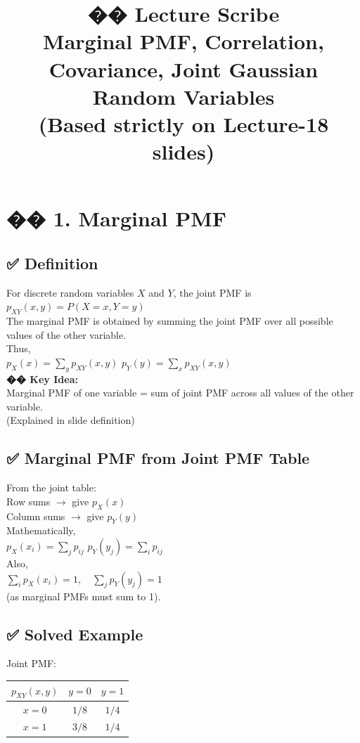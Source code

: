 \documentclass{article}
\begin{document}
\title{�� Lecture Scribe \\ Marginal PMF, Correlation, Covariance, Joint Gaussian Random Variables \\ (Based strictly on Lecture-18 slides)}
\maketitle

\section{�� 1. Marginal PMF}

\subsection{✅ Definition}
For discrete random variables $X$ and $Y$, the joint PMF is \\
$p_{XY}(x,y)=P(X=x,Y=y)$ \\
The marginal PMF is obtained by summing the joint PMF over all possible values of the other variable. \\
Thus, \\
$p_X(x)=\sum_{y} p_{XY}(x,y)$ \quad $p_Y(y)=\sum_{x} p_{XY}(x,y)$ \\
\textbf{�� Key Idea:} \\
Marginal PMF of one variable = sum of joint PMF across all values of the other variable. \\
(Explained in slide definition)

\subsection{✅ Marginal PMF from Joint PMF Table}
From the joint table: \\
Row sums $\rightarrow$ give $p_X(x)$ \\
Column sums $\rightarrow$ give $p_Y(y)$ \\
Mathematically, \\
$p_X(x_i)=\sum_j p_{ij}$ \quad $p_Y(y_j)=\sum_i p_{ij}$ \\
Also, \\
$\sum_i p_X(x_i)=1,\quad \sum_j p_Y(y_j)=1$ \\
(as marginal PMFs must sum to 1).

\subsection{✅ Solved Example}
Joint PMF: \\
\begin{tabular}{c|cc}
$p_{XY}(x,y)$ & $y=0$ & $y=1$ \\
\hline
$x=0$ & $1/8$ & $1/4$ \\
$x=1$ & $3/8$ & $1/4$ \\
\end{tabular}
\end{document}
